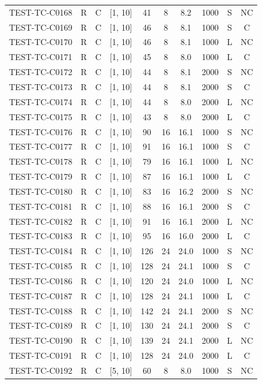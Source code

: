 \begin{longtable}{lccccccccc}
TEST-TC-C0168 & R & C & [1, 10] & 41 & 8 & 8.2 & 1000 & S & NC \\
TEST-TC-C0169 & R & C & [1, 10] & 46 & 8 & 8.1 & 1000 & S & C \\
TEST-TC-C0170 & R & C & [1, 10] & 46 & 8 & 8.1 & 1000 & L & NC \\
TEST-TC-C0171 & R & C & [1, 10] & 45 & 8 & 8.0 & 1000 & L & C \\
TEST-TC-C0172 & R & C & [1, 10] & 44 & 8 & 8.1 & 2000 & S & NC \\
TEST-TC-C0173 & R & C & [1, 10] & 44 & 8 & 8.1 & 2000 & S & C \\
TEST-TC-C0174 & R & C & [1, 10] & 44 & 8 & 8.0 & 2000 & L & NC \\
TEST-TC-C0175 & R & C & [1, 10] & 43 & 8 & 8.0 & 2000 & L & C \\
TEST-TC-C0176 & R & C & [1, 10] & 90 & 16 & 16.1 & 1000 & S & NC \\
TEST-TC-C0177 & R & C & [1, 10] & 91 & 16 & 16.1 & 1000 & S & C \\
TEST-TC-C0178 & R & C & [1, 10] & 79 & 16 & 16.1 & 1000 & L & NC \\
TEST-TC-C0179 & R & C & [1, 10] & 87 & 16 & 16.1 & 1000 & L & C \\
TEST-TC-C0180 & R & C & [1, 10] & 83 & 16 & 16.2 & 2000 & S & NC \\
TEST-TC-C0181 & R & C & [1, 10] & 88 & 16 & 16.1 & 2000 & S & C \\
TEST-TC-C0182 & R & C & [1, 10] & 91 & 16 & 16.1 & 2000 & L & NC \\
TEST-TC-C0183 & R & C & [1, 10] & 95 & 16 & 16.0 & 2000 & L & C \\
TEST-TC-C0184 & R & C & [1, 10] & 126 & 24 & 24.0 & 1000 & S & NC \\
TEST-TC-C0185 & R & C & [1, 10] & 128 & 24 & 24.1 & 1000 & S & C \\
TEST-TC-C0186 & R & C & [1, 10] & 120 & 24 & 24.0 & 1000 & L & NC \\
TEST-TC-C0187 & R & C & [1, 10] & 128 & 24 & 24.1 & 1000 & L & C \\
TEST-TC-C0188 & R & C & [1, 10] & 142 & 24 & 24.1 & 2000 & S & NC \\
TEST-TC-C0189 & R & C & [1, 10] & 130 & 24 & 24.1 & 2000 & S & C \\
TEST-TC-C0190 & R & C & [1, 10] & 139 & 24 & 24.1 & 2000 & L & NC \\
TEST-TC-C0191 & R & C & [1, 10] & 128 & 24 & 24.0 & 2000 & L & C \\
TEST-TC-C0192 & R & C & [5, 10] & 60 & 8 & 8.0 & 1000 & S & NC \\

\end{longtable}
